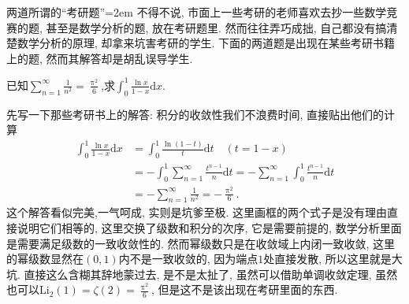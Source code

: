 \documentclass[UTF8,no-math,12pt,openany,table,dvipsnames,svgnames]{book}
\renewcommand{\pi}{\uppi}
\begin{document}
\begin{MYBOX}[colbacktitle=blue]{两道所谓的“考研题”}\parindent=2em
不得不说, 市面上一些考研的老师喜欢去抄一些数学竞赛的题, 甚至是数学分析的题, 放在考研题里. 然而往往弄巧成拙, 自己都没有搞清楚数学分析的原理, 却拿来坑害考研的学生. 下面的两道题是出现在某些考研书籍上的题, 然而其解答却是胡乱误导学生.

  已知$\sum_{n=1}^\infty\frac1{n^2}=\frac{\pi^2}6$,求$\int_0^1\frac{\ln x}{1-x}\mathrm dx$.

先写一下那些考研书上的解答: 积分的收敛性我们不浪费时间, 直接贴出他们的计算
\begin{align*}
  \int_0^1\frac{\ln x}{1-x}\mathrm dx
   & = \int_0^1\frac{\ln(1-t)}t\mathrm dt\quad (t=1-x)\\
   & = \boxed{- \int_0^1\sum_{n=1}^\infty\frac{t^{n-1}}n\mathrm dt}
     = \boxed{-\sum_{n=1}^\infty\int_0^1\frac{t^{n-1}}n\mathrm dt} \\
   & = -\sum_{n=1}^\infty\frac1{n^2}=-\frac{\pi^2}6.
\end{align*}
这个解答看似完美,一气呵成, 实则是坑爹至极. 这里画框的两个式子是没有理由直接说明它们相等的, 这里交换了级数和积分的次序, 它是需要前提的, 数学分析里面是需要满足级数的一致收敛性的. 然而幂级数只是在收敛域上内闭一致收敛, 这里的幂级数显然在$(0,1)$内不是一致收敛的, 因为端点$1$处直接发散, 所以这里就是大坑. 直接这么含糊其辞地蒙过去, 是不是太扯了, 虽然可以借助单调收敛定理, 虽然也可以$\textrm{Li}_2(1)=\zeta(2)=\frac{\pi^2}6$, 但是这不是该出现在考研里面的东西.


\end{MYBOX}
\end{document}
